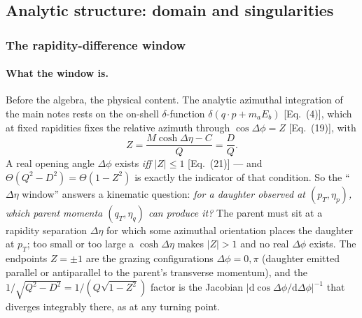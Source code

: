 \documentclass[11pt]{article}
\begin{document}
\subsection{Analytic structure: domain and singularities}
\label{sec:kernel-analytic}

\subsubsection{The rapidity-difference window}
\label{sec:window}

\paragraph{What the window is.}
Before the algebra, the physical content.  The analytic azimuthal
integration of the main notes rests on the on-shell $\delta$-function
$\delta(q\cdot p+m_aE_b)$ [Eq.~(4)], which at fixed rapidities fixes the
relative azimuth through $\cos\Delta\phi=Z$ [Eq.~(19)], with
\begin{equation}
Z=\frac{M\cosh\Delta\eta-C}{Q}=\frac{D}{Q}.
\end{equation}
A real opening angle $\Delta\phi$ exists \emph{iff} $|Z|\le1$ [Eq.~(21)]
--- and $\Theta(Q^2-D^2)=\Theta(1-Z^2)$ is exactly the indicator of that
condition.  So the ``$\Delta\eta$ window'' answers a kinematic question:
\emph{for a daughter observed at $(p_T,\eta_p)$, which parent momenta
$(q_T,\eta_q)$ can produce it?}  The parent must sit at a rapidity
separation $\Delta\eta$ for which some azimuthal orientation places the
daughter at $p_T$; too small or too large a $\cosh\Delta\eta$ makes
$|Z|>1$ and no real $\Delta\phi$ exists.  The endpoints $Z=\pm1$ are the
grazing configurations $\Delta\phi=0,\pi$ (daughter emitted parallel or
antiparallel to the parent's transverse momentum), and the
$1/\sqrt{Q^2-D^2}=1/(Q\sqrt{1-Z^2})$ factor is the Jacobian
$|\mathrm{d}\cos\Delta\phi/\mathrm{d}\Delta\phi|^{-1}$ that diverges
integrably there, as at any turning point.
\end{document}
